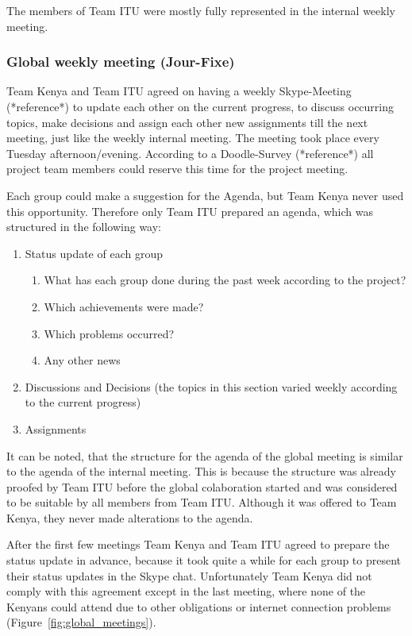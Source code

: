 The members of Team ITU were mostly fully represented in the internal weekly meeting. 

\subsubsection {Global weekly meeting (Jour-Fixe)}
Team Kenya and Team ITU agreed on having a weekly Skype-Meeting (*reference*) to update each other on the current progress, to discuss occurring topics, make decisions and assign each other new assignments till the next meeting, just like the weekly internal meeting. The meeting took place every Tuesday afternoon/evening. According to a Doodle-Survey (*reference*) all project team members could reserve this time for the project meeting.

Each group could make a suggestion for the Agenda, but Team Kenya never used this opportunity. Therefore only Team ITU prepared an agenda, which was structured in the following way:

	\begin{enumerate}
		\item Status update of each group
			\begin{enumerate}
				\item What has each group done during the past week according to the project?
				\item Which achievements were made?	
				\item Which problems occurred?
				\item Any other news
			\end{enumerate}
		\item Discussions and Decisions (the topics in this section varied weekly according to the current progress)
		\item Assignments
	\end{enumerate}

It can be noted, that the structure for the agenda of the global meeting is similar to the agenda of the internal meeting. This is because the structure was already proofed by Team ITU before the global colaboration started and was considered to be suitable by all members from Team ITU. Although it was offered to Team Kenya, they never made alterations to the agenda.

After the first few meetings Team Kenya and Team ITU agreed to prepare the status update in advance, because it took quite a while for each group to present their status updates in the Skype chat. Unfortunately Team Kenya did not comply with this agreement except in the last meeting, where none of the Kenyans could attend due to other obligations or internet connection problems (Figure~\ref{fig:global_meetings}).

